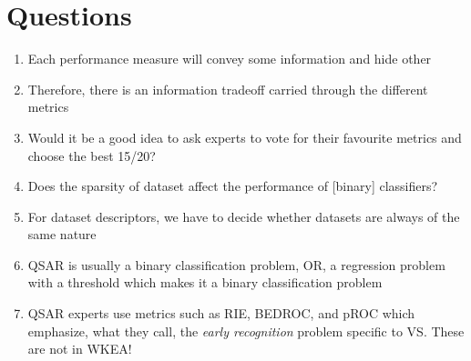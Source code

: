 \documentclass[a4paper,12pt, english]{article}
\begin{document}
\section{Questions}
\begin{enumerate}
	\item Each performance measure will convey some information and hide other
	\item Therefore, there is an information tradeoff carried through the different metrics
	\item Would it be a good idea to ask experts to vote for their favourite metrics and choose the best 15/20?
	\item Does the sparsity of dataset affect the performance of [binary] classifiers?
	\item For dataset descriptors, we have to decide whether datasets are always of the same nature
	\item QSAR is usually a binary classification problem, OR, a regression problem with a threshold which makes it a binary classification problem
	\item QSAR experts use metrics such as RIE, BEDROC, and pROC which emphasize,  what they call, the \emph{early recognition} problem specific to VS. These are not in WKEA!
	
\end{enumerate}  			
\end{document}

